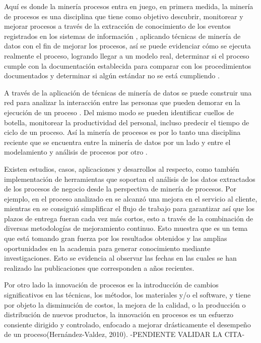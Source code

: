 \documentclass[a4paper, 11pt, titlepage]{article}
\begin{document}
Aquí es donde la minería procesos entra en juego, en primera medida, la minería de procesos es una disciplina que tiene como objetivo descubrir, monitorear y mejorar procesos a través de la extracción de conocimiento de los eventos registrados en los sistemas de información \cite{van_der_aalst_process_2012}, aplicando  técnicas de minería de datos con el fin de mejorar los procesos, así se puede evidenciar cómo se ejecuta realmente el proceso, logrando llegar a un modelo real, determinar si el proceso cumple con la documentación establecida para comparar con los procedimientos documentados y determinar si algún estándar no se está cumpliendo \cite{rozinat_process_2010}.

A través de la aplicación de técnicas de minería de datos se puede construir una red para analizar la interacción entre las personas que pueden demorar en la ejecución de un proceso \cite{van_der_aalst_process_2012}. Del mismo modo se pueden identificar cuellos de botella, monitorear la productividad del personal, incluso predecir el tiempo de ciclo de un proceso. Así la minería de procesos es por lo tanto una disciplina reciente que se encuentra entre la minería de datos por un lado y entre el modelamiento y análisis de procesos por otro \cite{van_der_aalst_process_2012}.

Existen estudios, casos, aplicaciones y desarrollos al respecto, como también implementación de herramientas que soportan el análisis de los datos extractados de los procesos de negocio desde la perspectiva de minería de procesos. Por ejemplo, en el proceso analizado en \cite{fong_data_2002} se alcanzó una mejora en el servicio al cliente, mientras en \cite{ho_development_2007} se consiguió simplificar el flujo de trabajo para garantizar así que los plazos de entrega fueran cada vez más cortos, esto a través de la combinación de diversas metodologías de mejoramiento continuo. Esto muestra que es un tema que está tomando gran fuerza por los resultados obtenidos y las amplias oportunidades en la academia para generar conocimiento mediante investigaciones. Esto se evidencia al observar las fechas en las cuales se han realizado las publicaciones que corresponden a años recientes.

Por otro lado la innovación de procesos es la introducción de cambios significativos en las técnicas, los métodos, los materiales y/o el software, y tiene por objeto la disminución de costos, la mejora de la calidad, o la producción o distribución de nuevos productos, la innovación en procesos es un esfuerzo consiente dirigido y controlado, enfocado a mejorar drásticamente el desempeño de un proceso(Hernández-Valdez, 2010). -PENDIENTE VALIDAR LA CITA-
\end{document}
